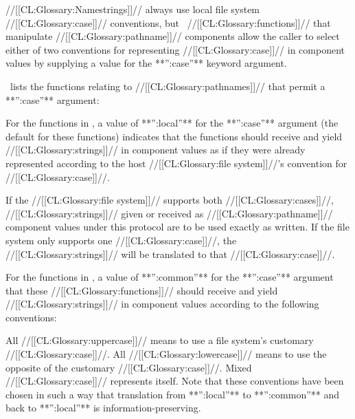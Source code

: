 //[[CL:Glossary:Namestrings]]// always use local file system //[[CL:Glossary:case]]// conventions, 
but \clisp\ //[[CL:Glossary:functions]]// that manipulate //[[CL:Glossary:pathname]]// components
allow the caller to select either of two conventions for representing
//[[CL:Glossary:case]]// in component values by supplying a value for the
**'':case''** keyword argument.

\Thenextfigure\ lists the functions 
relating to //[[CL:Glossary:pathnames]]// that permit a **'':case''** argument:



For the functions in \figref\PathnameCaseFuns,
a value of **'':local''** for the **'':case''** argument 
(the default for these functions)
indicates that the functions should receive and yield //[[CL:Glossary:strings]]// in component values
as if they were already represented according to the host //[[CL:Glossary:file system]]//'s 
convention for //[[CL:Glossary:case]]//.

If the //[[CL:Glossary:file system]]// supports both //[[CL:Glossary:cases]]//, //[[CL:Glossary:strings]]// given or received
as //[[CL:Glossary:pathname]]// component values under this protocol are to be used exactly
as written.  If the file system only supports one //[[CL:Glossary:case]]//, 
the //[[CL:Glossary:strings]]// will be translated to that //[[CL:Glossary:case]]//.

\endsubsubsubsubsection%


For the functions in \figref\PathnameCaseFuns,
a value of **'':common''** for the **'':case''** argument 
that these //[[CL:Glossary:functions]]// should receive 
and yield //[[CL:Glossary:strings]]// in component values according to the following conventions:

\beginlist
\itemitem{\bull}
All //[[CL:Glossary:uppercase]]// means to use a file system's customary //[[CL:Glossary:case]]//.
\itemitem{\bull}
All //[[CL:Glossary:lowercase]]// means to use the opposite of the customary //[[CL:Glossary:case]]//.
\itemitem{\bull}
Mixed //[[CL:Glossary:case]]// represents itself.
\endlist
Note that these conventions have been chosen in such a way that translation
from **'':local''** to **'':common''** and back to **'':local''** is information-preserving.
 
